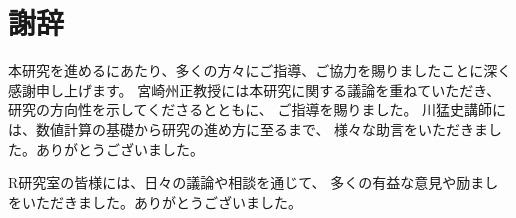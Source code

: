 \documentclass[/Users/ikedahajime/GitHub/reserch/master_report/thesis]{subfiles}
\begin{document}
\chapter*{謝辞}
本研究を進めるにあたり、多くの方々にご指導、ご協力を賜りましたことに深く感謝申し上げます。
宮崎州正教授には本研究に関する議論を重ねていただき、研究の方向性を示してくださるとともに、
ご指導を賜りました。
川猛史講師には、数値計算の基礎から研究の進め方に至るまで、
様々な助言をいただきました。ありがとうございました。

R研究室の皆様には、日々の議論や相談を通じて、
多くの有益な意見や励ましをいただきました。ありがとうございました。
\end{document}
